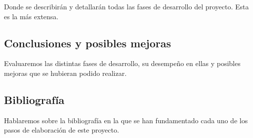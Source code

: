 Donde se describirán y detallarán todas las fases de desarrollo del proyecto. Esta es la más extensa.

\subsection{Conclusiones y posibles mejoras}

Evaluaremos las distintas fases de desarrollo, su desempeño en ellas y posibles mejoras que se hubieran podido realizar.

\subsection{Bibliografía}

Hablaremos sobre la bibliografía en la que se han fundamentado cada uno de los pasos de elaboración de este proyecto.